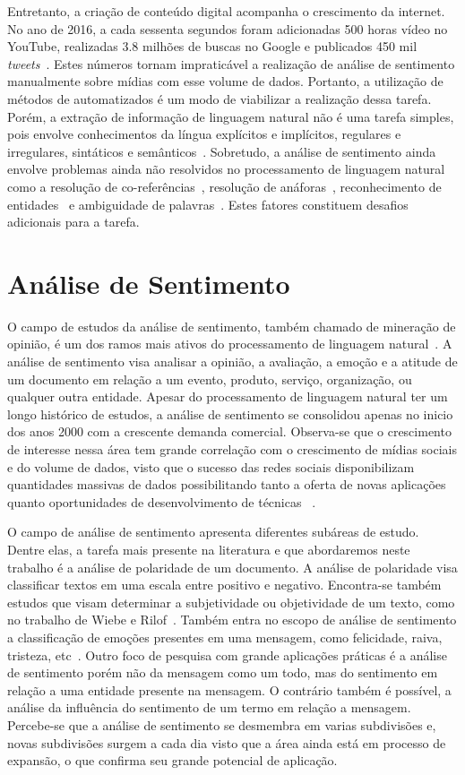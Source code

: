 Entretanto, a criação de conteúdo digital acompanha o crescimento da internet.
No ano de 2016, a cada sessenta segundos foram adicionadas 500 horas vídeo no YouTube, realizadas 3.8 milhões de buscas
no Google e publicados 450 mil \textit{tweets}~\cite{smartinsights}.
Estes números tornam impraticável a realização de análise de sentimento manualmente sobre mídias com esse volume de
dados.
Portanto, a utilização de métodos de automatizados é um modo de viabilizar a realização dessa tarefa.
Porém, a extração de informação de linguagem natural não é uma tarefa simples, pois envolve conhecimentos da língua
explícitos e implícitos, regulares e irregulares, sintáticos e semânticos~\cite{cambria13}.
Sobretudo, a análise de sentimento ainda envolve problemas ainda não resolvidos no processamento de linguagem
natural~\cite{cambria13}
como a resolução de co-referências~\cite{soon01}, resolução de anáforas~\cite{lappin94}, reconhecimento de
entidades~\cite{nadeau07} e ambiguidade de palavras~\cite{yarowsky95}.
Estes fatores constituem desafios adicionais para a tarefa.

\section{Análise de Sentimento}

O campo de estudos da análise de sentimento, também chamado de mineração de opinião, é um dos ramos mais ativos do
processamento de linguagem natural~\cite{liu12}.
A análise de sentimento visa analisar a opinião, a avaliação, a emoção e a atitude de um documento em relação a um
evento, produto, serviço, organização, ou qualquer outra entidade.
Apesar do processamento de linguagem natural ter um longo histórico de estudos, a análise de sentimento se consolidou
apenas no inicio dos anos 2000 com a crescente demanda comercial.
Observa-se que o crescimento de interesse nessa área tem grande correlação com o crescimento de mídias sociais e do
volume de dados, visto que o sucesso das redes sociais disponibilizam quantidades massivas de dados possibilitando tanto
a oferta de novas aplicações quanto oportunidades de desenvolvimento de técnicas ~\cite{liu12}.

O campo de análise de sentimento apresenta diferentes subáreas de estudo.
Dentre elas, a tarefa mais presente na literatura e que abordaremos neste trabalho é a análise de polaridade de um
documento.
A análise de polaridade visa classificar textos em uma escala entre positivo e negativo.
Encontra-se também estudos que visam determinar a subjetividade ou objetividade de um texto, como no trabalho de Wiebe e
Rilof~\cite{Wiebe05}.
Também entra no escopo de análise de sentimento a classificação de emoções presentes em uma mensagem, como felicidade,
raiva, tristeza, etc~\cite{bollen11b}.
Outro foco de pesquisa com grande aplicações práticas é a análise de sentimento porém não da mensagem como um todo, mas
do sentimento em relação a uma entidade presente na mensagem.
O contrário também é possível, a análise da influência do sentimento de um termo em relação a mensagem.
Percebe-se que a análise de sentimento se desmembra em varias subdivisões e, novas subdivisões surgem a cada dia visto
que a área ainda está em processo de expansão, o que confirma seu grande potencial de aplicação.

